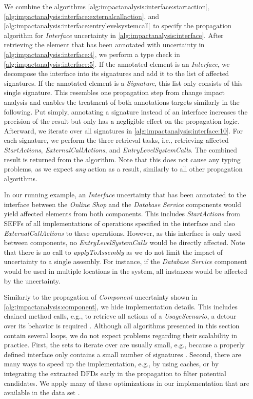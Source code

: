 We combine the algorithms \ref{alg:impactanalysis:interface:startaction}, \ref{alg:impactanalysis:interface:externalcallaction}, and \ref{alg:impactanalysis:interface:entrylevelsystemcall} to specify the propagation algorithm for \emph{Interface} uncertainty in \autoref{alg:impactanalysis:interface}.
After retrieving the element that has been annotated with uncertainty in \autoref{alg:impactanalysis:interface:4}, we perform a type check in \autoref{alg:impactanalysis:interface:5}.
If the annotated element is an \emph{Interface}, we decompose the interface into its signatures and add it to the list of affected signatures.
If the annotated element is a \emph{Signature}, this list only consists of this single signature.
This resembles one propagation step from change impact analysis \cite{rostami_architecture-based_2017,busch_architecture-based_2020} and enables the treatment of both annotations targets similarly in the following.
Put simply, annotating a signature instead of an interface increases the precision of the result but only has a negligible effect on the propagation logic.
Afterward, we iterate over all signatures in \autoref{alg:impactanalysis:interface:10}.
For each signature, we perform the three retrieval tasks, i.e., retrieving affected \emph{StartActions}, \emph{ExternalCallActions}, and \emph{EntryLevelSystemCalls}.
The combined result is returned from the algorithm.
Note that this does not cause any typing problems, as we expect \emph{any} action as a result, similarly to all other propagation algorithms.

In our running example, an \emph{Interface} uncertainty that has been annotated to the interface between the \emph{Online Shop} and the \emph{Database Service} components would yield affected elements from both components.
This includes \emph{StartActions} from \acp{SEFF} of all implementations of operations specified in the interface and also \emph{ExternalCallActions} to these operations.
However, as this interface is only used between components, no \emph{EntryLevelSystemCalls} would be directly affected.
Note that there is no call to \emph{applyToAssembly} as we do not limit the impact of uncertainty to a single assembly.
For instance, if the \emph{Database Service} component would be used in multiple locations in the system, all instances would be affected by the uncertainty.

Similarly to the propagation of \emph{Component} uncertainty shown in \autoref{alg:impactanalysis:component}, we hide implementation details.
This includes chained method calls, e.g., to retrieve all actions of a \emph{UsageScenario}, a detour over its behavior is required \cite{reussner_palladio_2024}.
Although all algorithms presented in this section contain several loops, we do not expect problems regarding their scalability in practice.
First, the sets to iterate over are usually small, e.g., because a properly defined interface only contains a small number of signatures \cite{martin_clean_2017}.
Second, there are many ways to speed up the implementation, e.g., by using caches, or by integrating the extracted \acp{DFD} early in the propagation to filter potential candidates.
We apply many of these optimizations in our implementation that are available in the data set \cite{dataset}.


